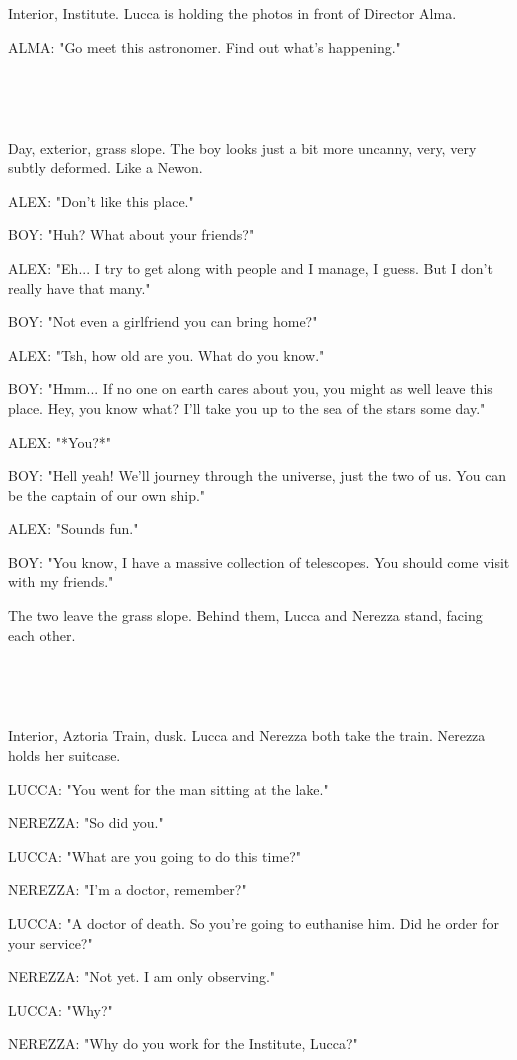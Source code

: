 \documentclass[11pt]{article}
\begin{document}
\ 

\ 

Interior, Institute.
Lucca is holding the photos in front of Director Alma. 

ALMA: "Go meet this astronomer.
Find out what's happening."

\ 

\ 

Day, exterior, grass slope. 
The boy looks just a bit more uncanny, very, very subtly deformed.
Like a Newon.

ALEX: "Don't like this place."

BOY: "Huh? What about your friends?"

ALEX: "Eh... I try to get along with people and I manage, I guess.
But I don't really have that many."

BOY: "Not even a girlfriend you can bring home?"

ALEX: "Tsh, how old are you. 
What do you know."

BOY: "Hmm... If no one on earth cares about you, you might as well leave this place.
Hey, you know what? 
I'll take you up to the sea of the stars some day."

ALEX: "*You?*"

BOY: "Hell yeah!
We'll journey through the universe, just the two of us.
You can be the captain of our own ship."

ALEX: "Sounds fun."

BOY: "You know, I have a massive collection of telescopes.
You should come visit with my friends."

The two leave the grass slope.
Behind them, Lucca and Nerezza stand, facing each other.

\ 

\ 

Interior, Aztoria Train, dusk.
Lucca and Nerezza both take the train.
Nerezza holds her suitcase.

LUCCA: "You went for the man sitting at the lake."

NEREZZA: "So did you."

LUCCA: "What are you going to do this time?"

NEREZZA: "I'm a doctor, remember?"

LUCCA: "A doctor of death.
So you're going to euthanise him. 
Did he order for your service?"

NEREZZA: "Not yet. I am only observing."

LUCCA: "Why?"

NEREZZA: "Why do you work for the Institute, Lucca?"
\end{document}
